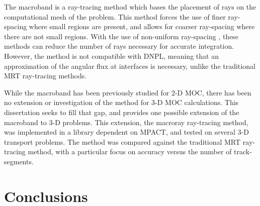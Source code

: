 {{{      The macroband \cite{Villarino1992,Petkov1999,Yamamoto2005,Fevotte2007} is a ray-tracing method which bases the placement of rays on the computational mesh of the problem.
      This method forces the use of finer ray-spacing where small regions are present, and allows for coarser ray-spacing where there are not small regions.
      With the use of non-uniform ray-spacing \cite{Yamamoto2005}, these methods can reduce the number of rays necessary for accurate integration.
      However, the method is not compatible with \acf{DNPL}, meaning that an approximation of the angular flux at interfaces is necessary, unlike the traditional \acf{MRT} ray-tracing methods.

      While the macroband has been previously studied for 2-D \ac{MOC}, there has been no extension or investigation of the method for 3-D \ac{MOC} calculations.
      This dissertation seeks to fill that gap, and provides one possible extension of the macroband to 3-D problems.
      This extension, the macroray ray-tracing method, was implemented in a library dependent on MPACT, and tested on several 3-D transport problems.
      The method was compared against the traditional \ac{MRT} ray-tracing method, with a particular focus on accuracy versus the number of track-segments.
    }
  }

  \section{Conclusions}{\label{sec:Conclusions}
}}
